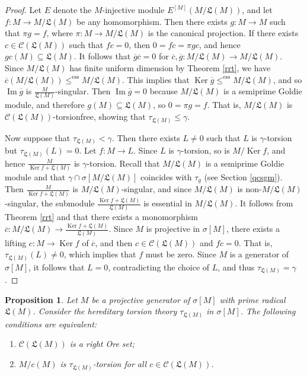 \documentclass{amsart}
\newtheorem{prop}[thm]{Proposition}
\theoremstyle{definition}
\theoremstyle{remark}
\numberwithin{equation}{section}
\DeclareMathOperator{\Ker}{Ker}
\DeclareMathOperator{\Img}{Im}
\newcommand{\sm}{\sigma[M]}
\newcommand{\ess}{\leq^\text{ess}}
\begin{document}
\begin{proof}
	Let $E$ denote the $M$-injective module $E^{[M]}(M/\mathfrak{L}(M))$, 
	and let $f:M\to M/\mathfrak{L}(M)$ be any homomorphism. 
	Then there exists $g:M\to M$ such that $\pi g=f$,
	where $\pi:M\to M/\mathfrak{L}(M)$ is the canonical projection. 
	If there exists $c\in\mathcal{C}(\mathfrak{L}(M))$ such that $fc=0$, 
	then $0=fc=\pi gc$, 
	and hence $gc(M)\subseteq\mathfrak{L}(M)$. 
	It follows that $\overline{g}\overline{c}=0$ 
	for $\overline{c},\overline{g}:M/\mathfrak{L}(M)\to M/\mathfrak{L}(M)$. 
	Since $M/\mathfrak{L}(M)$ has finite uniform dimension by Theorem \ref{rrt}, 
	we have $\overline{c}(M/\mathfrak{L}(M))\ess M/\mathfrak{L}(M)$. 
	This implies that $\Ker\overline{g}\ess M/\mathfrak{L}(M)$,
	and so $\Img\overline{g}$ is $\frac{M}{\mathfrak{L}(M)}$-singular. 
	Then $\Img\overline{g}=0$ 
	because $M/\mathfrak{L}(M)$ is a semiprime Goldie module, 
	and therefore $g(M)\subseteq\mathfrak{L}(M)$, 
	so $0=\pi g=f$. 
	That is, $M/\mathfrak{L}(M)$ is $\mathcal{C}(\mathfrak{L}(M))$-torsionfree, 
	showing that $\tau_{\mathfrak{L}(M)}\leq\gamma$.
	
	Now suppose that $\tau_{\mathfrak{L}(M)}<\gamma$. 
	Then there exists $L \neq 0$ such that $L$ is $\gamma$-torsion 
	but $\tau_{\mathfrak{L}(M)}(L)=0$. 
	Let $f:M\to L$. 
	Since $L$ is $\gamma$-torsion, so is $M/\Ker f$, 
	and hence $\frac{M}{\Ker f+\mathfrak{L}(M)}$ is $\gamma$-torsion. 
	Recall that $M/\mathfrak{L}(M)$ is a semiprime Goldie module 
	and that $\gamma\cap\sigma[M/\mathfrak{L}(M)]$ 
	coincides with $\tau_g$ (see Section \ref{qcsgm}). 
	Then $\frac{M}{\Ker f+\mathfrak{L}(M)}$ is $M/\mathfrak{L}(M)$-singular, 
	and since $M/\mathfrak{L}(M)$ is non-$M/\mathfrak{L}(M)$-singular, 
	the submodule $\frac{\Ker f+\mathfrak{L}(M)}{\mathfrak{L}(M)}$ 
	is essential in $M/\mathfrak{L}(M)$. 
	It follows from Theorem \ref{rrt} and \cite[Theorem 2.8]{maugoldie}
	that there exists a monomorphism 
	$\overline{c}:M/\mathfrak{L}(M)\to 
	\frac{\Ker f+\mathfrak{L}(M)}{\mathfrak{L}(M)}$. 
	Since $M$ is projective in $\sm$, 
	there exists a lifting $c:M\to \Ker f$ of $\overline{c}$,
	and then $c\in\mathcal{C}(\mathfrak{L}(M))$ and $fc=0$. 
	That is, $\tau_{\mathfrak{L}(M)}(L)\neq 0$, 
	which implies that $f$ must be zero. 
	Since $M$ is a generator of $\sm$, it follows that $L=0$, 
	contradicting the choice of $L$, and thus $\tau_{\mathfrak{L}(M)}=\gamma$.
\end{proof}

\begin{prop}\label{55}
	Let $M$ be a projective generator of $\sm$ 
	with prime radical $\mathfrak{L}(M)$. 
	Consider the hereditary torsion theory $\tau_{\mathfrak{L}(M)}$ in $\sm$. 
	The following conditions are equivalent:
	\begin{enumerate}[label=\emph{(\alph*)}]
		\item $\mathcal{C}(\mathfrak{L}(M))$ is a right Ore set;
		\item $M/c(M)$ is $\tau_{\mathfrak{L}(M)}$-torsion for all 
		$c\in\mathcal{C}(\mathfrak{L}(M))$.
	\end{enumerate} 
\end{prop}
\end{document}
